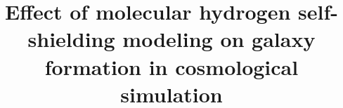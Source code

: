\documentclass[linenumbers, twocolumn]{aastex631}
\begin{document}
\title{Effect of molecular hydrogen self-shielding modeling on galaxy formation in cosmological simulation}


\end{document}
